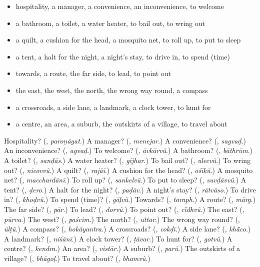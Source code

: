 \begin{itemize}
\raggedright
  \item hospitality, a manager, a convenience, an inconvenience, to welcome
  \item a bathroom, a toilet, a water heater, to bail out, to wring out
  \item a quilt, a cushion for the head, a mosquito net, to roll up, to put to sleep
  \item a tent, a halt for the night, a night's stay, to drive in, to spend (time)
  \item towards, a route, the far side, to lead, to point out
  \item the east, the west, the north, the wrong way round, a compass
  \item a crossroads, a side lane, a landmark, a clock tower, to hunt for
  \item a centre, an area, a suburb, the outskirts of a village, to travel about
\end{itemize}

\begin{tcolorbox}[breakable,colback=teal!4,colframe=teal!35!black,title={Before you move on}]
Hospitality? (\textbf{}, \emph{paroṇāgat}.) A manager? (\textbf{}, \emph{menejar}.) A convenience? (\textbf{}, \emph{sagvaḍ}.) An inconvenience? (\textbf{}, \emph{agvaḍ}.) To welcome? (\textbf{}, \emph{āvkārvũ}.) A bathroom? (\textbf{}, \emph{bāthrūm}.) A toilet? (\textbf{}, \emph{sanḍās}.) A water heater? (\textbf{}, \emph{gījhar}.) To bail out? (\textbf{}, \emph{ulecvũ}.) To wring out? (\textbf{}, \emph{nicovvũ}.) A quilt? (\textbf{}, \emph{rajāī}.) A cushion for the head? (\textbf{}, \emph{ośīkũ}.) A mosquito net? (\textbf{}, \emph{macchardānī}.) To roll up? (\textbf{}, \emph{sankelvũ}.) To put to sleep? (\textbf{}, \emph{suvḍāvvũ}.) A tent? (\textbf{}, \emph{ḍero}.) A halt for the night? (\textbf{}, \emph{paḍāv}.) A night's stay? (\textbf{}, \emph{rātvāso}.) To drive in? (\textbf{}, \emph{khoḍvũ}.) To spend (time)? (\textbf{}, \emph{gāḷvũ}.) Towards? (\textbf{}, \emph{taraph}.) A route? (\textbf{}, \emph{mārg}.) The far side? (\textbf{}, \emph{pār}.) To lead? (\textbf{}, \emph{dorvũ}.) To point out? (\textbf{}, \emph{cī̃dhvũ}.) The east? (\textbf{}, \emph{pūrva}.) The west? (\textbf{}, \emph{paścim}.) The north? (\textbf{}, \emph{uttar}.) The wrong way round? (\textbf{}, \emph{ūlṭũ}.) A compass? (\textbf{}, \emph{hokāyantra}.) A crossroads? (\textbf{}, \emph{cokḍī}.) A side lane? (\textbf{}, \emph{khā̃co}.) A landmark? (\textbf{}, \emph{niśānī}.) A clock tower? (\textbf{}, \emph{ṭāvar}.) To hunt for? (\textbf{}, \emph{gotvũ}.) A centre? (\textbf{}, \emph{kendra}.) An area? (\textbf{}, \emph{vistār}.) A suburb? (\textbf{}, \emph{parũ}.) The outskirts of a village? (\textbf{}, \emph{bhāgoḷ}.) To travel about? (\textbf{}, \emph{bhamvũ}.)
\end{tcolorbox}
